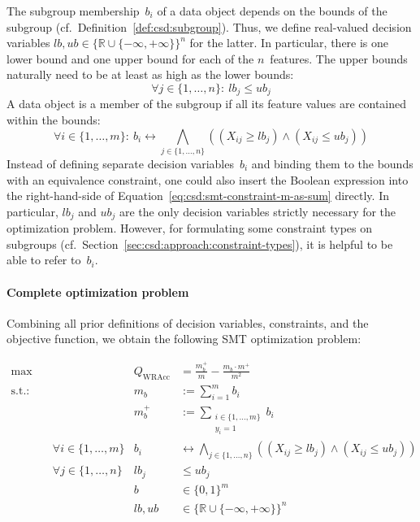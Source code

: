 \documentclass{article}
\theoremstyle{definition}
\begin{document}
The subgroup membership~$b_i$ of a data object depends on the bounds of the subgroup (cf.~Definition~\ref{def:csd:subgroup}).
Thus, we define real-valued decision variables $\mathit{lb}, \mathit{ub} \in \{\mathbb{R} \cup \{-\infty, +\infty\}\}^n$ for the latter.
In particular, there is one lower bound and one upper bound for each of the $n$~features.
The upper bounds naturally need to be at least as high as the lower bounds:
%
\begin{equation}
	\forall j \in \{1, \dots, n\}:~ \mathit{lb}_j\leq \mathit{ub}_j
	\label{eq:csd:smt-constraint-bounds-monotonic}
\end{equation}
%
A data object is a member of the subgroup if all its feature values are contained within the bounds:
%
\begin{equation}
	\forall i \in \{1, \dots, m\}:~ b_i\leftrightarrow \bigwedge_{j \in \{1, \dots, n\}} \left( \left( X_{ij} \geq \mathit{lb}_j \right) \land \left( X_{ij} \leq \mathit{ub}_j \right) \right)
	\label{eq:csd:smt-constraint-subgroup-membership}
\end{equation}
%
Instead of defining separate decision variables~$b_i$ and binding them to the bounds with an equivalence constraint, one could also insert the Boolean expression into the right-hand-side of Equation~\ref{eq:csd:smt-constraint-m-as-sum} directly.
In particular, $\mathit{lb}_j$ and $\mathit{ub}_j$ are the only decision variables strictly necessary for the optimization problem.
However, for formulating some constraint types on subgroups (cf.~Section~\ref{sec:csd:approach:constraint-types}), it is helpful to be able to refer to~$b_i$.

\paragraph{Complete optimization problem}

Combining all prior definitions of decision variables, constraints, and the objective function, we obtain the following SMT optimization problem:

\begin{equation}
	\begin{aligned}
		\max &\quad & Q_{\text{WRAcc}} &= \frac{m_b^+}{m} - \frac{m_b \cdot m^+}{m^2} \\
		\text{s.t.:} &\quad & m_b &:= \sum_{i=1}^{m} b_i \\
		&\quad & m_b^+ &:= \sum_{\substack{i \in \{1, \dots, m\} \\ y_i = 1 }} b_i \\
		&\quad \forall i \in \{1, \dots, m\} & b_i &\leftrightarrow \bigwedge_{j \in \{1, \dots, n\}} \left( \left( X_{ij} \geq \mathit{lb}_j \right) \land \left( X_{ij} \leq \mathit{ub}_j \right) \right) \\
		&\quad \forall j \in \{1, \dots, n\} & \mathit{lb}_j &\leq \mathit{ub}_j \\
		&\quad & b &\in \{0, 1\}^m \\
		&\quad & \mathit{lb}, \mathit{ub} &\in \{\mathbb{R} \cup \{-\infty, +\infty\}\}^n
	\end{aligned}
	\label{eq:csd:smt-problem-unconstrained-complete}
\end{equation}
\end{document}
